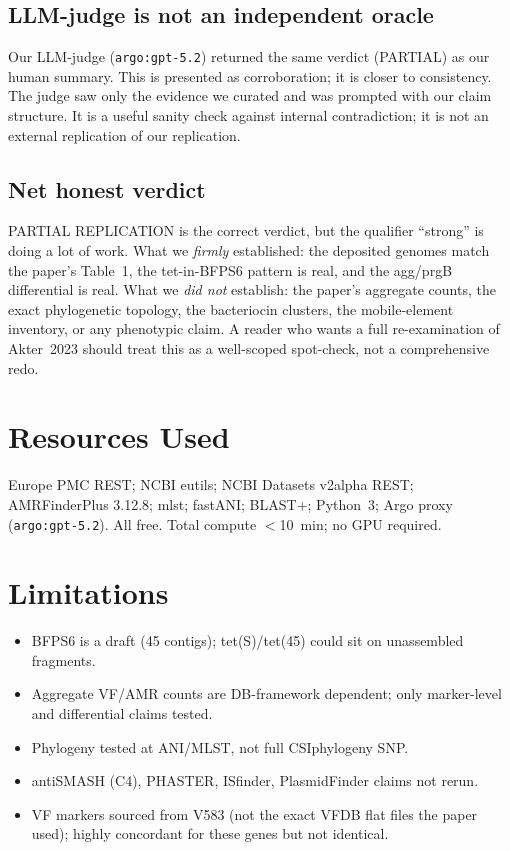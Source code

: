 \documentclass[11pt]{article}
\begin{document}
\subsection{LLM-judge is not an independent oracle}
Our LLM-judge (\texttt{argo:gpt-5.2}) returned the same verdict (PARTIAL) as our human summary. This is presented as corroboration; it is closer to consistency. The judge saw only the evidence we curated and was prompted with our claim structure. It is a useful sanity check against internal contradiction; it is not an external replication of our replication.

\subsection{Net honest verdict}
PARTIAL REPLICATION is the correct verdict, but the qualifier ``strong'' is doing a lot of work. What we \emph{firmly} established: the deposited genomes match the paper's Table~1, the tet-in-BFPS6 pattern is real, and the agg/prgB differential is real. What we \emph{did not} establish: the paper's aggregate counts, the exact phylogenetic topology, the bacteriocin clusters, the mobile-element inventory, or any phenotypic claim. A reader who wants a full re-examination of Akter~2023 should treat this as a well-scoped spot-check, not a comprehensive redo.

\section{Resources Used}
Europe PMC REST; NCBI eutils; NCBI Datasets v2alpha REST; AMRFinderPlus 3.12.8; mlst; fastANI; BLAST+; Python~3; Argo proxy (\texttt{argo:gpt-5.2}). All free. Total compute $<$10~min; no GPU required.

\section{Limitations}
\begin{itemize}
\item BFPS6 is a draft (45 contigs); tet(S)/tet(45) could sit on unassembled fragments.
\item Aggregate VF/AMR counts are DB-framework dependent; only marker-level and differential claims tested.
\item Phylogeny tested at ANI/MLST, not full CSIphylogeny SNP.
\item antiSMASH (C4), PHASTER, ISfinder, PlasmidFinder claims not rerun.
\item VF markers sourced from V583 (not the exact VFDB flat files the paper used); highly concordant for these genes but not identical.
\end{itemize}
\end{document}
